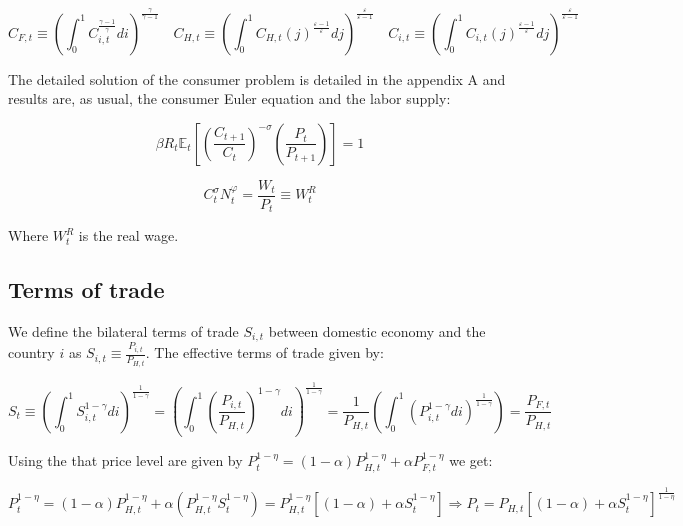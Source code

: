 \documentclass{article}
\newcommand{\Et}{\mathbb{E}_t}
\begin{document}
\begin{equation*}
    C_{F,t} \equiv \left( \int^1_0 C_{i,t}^{\frac{\gamma-1}{\gamma}} di \right)^{\frac{\gamma}{\gamma-1}} \quad C_{H,t} \equiv \left( \int^1_0 C_{H,t}(j)^{\frac{\varepsilon-1}{\varepsilon}} dj \right)^{\frac{\varepsilon}{\varepsilon-1}} \quad C_{i,t} \equiv \left( \int^1_0 C_{i,t}(j)^{\frac{\varepsilon-1}{\varepsilon}} dj \right)^{\frac{\varepsilon}{\varepsilon-1}}
\end{equation*}



The detailed solution of the consumer problem is detailed in the appendix A and results are, as usual, the consumer Euler equation and the labor supply:

\begin{equation}
    \label{euler}
    \beta R_t \Et\left[\left(\frac{C_{t+1}}{C_t} \right)^{-\sigma} \left(\frac{P_t}{P_{t+1}} \right) \right] = 1
\end{equation}

\begin{equation}
    \label{labour_supply}
    C_t^\sigma N_t^\varphi = \frac{W_t}{P_t} \equiv W_t^R
\end{equation}

Where $W_t^R$ is the real wage.

\subsection{Terms of trade}
We define the bilateral terms of trade $S_{i,t}$ between domestic economy and the country $i$ as $S_{i,t} \equiv \frac{P_{i,t}}{P_{H,t}}$. The effective terms of trade given by:

\begin{equation}
    S_t \equiv \left(\int^1_0 S_{i,t}^{1-\gamma} di \right)^{\frac{1}{1-\gamma}} = \left(\int^1_0 \left(\frac{P_{i,t}}{P_{H,t}}  \right)^{1-\gamma}  di \right)^{\frac{1}{1-\gamma}} = \frac{1}{P_{H,t}} \left(\int^1_0 \left(P_{i,t}^{1-\gamma} di \right)^{\frac{1}{1-\gamma}}\right) = \frac{P_{F,t}}{P_{H,t}}
\end{equation}

Using the that price level are given by $P_t^{1-\eta} = (1-\alpha) P_{H,t}^{1-\eta} + \alpha P_{F,t}^{1-\eta}$ we get:

\begin{equation}
    \label{tot_level}
    P_t^{1-\eta} = (1-\alpha) P_{H,t}^{1-\eta} + \alpha \left( P_{H,t}^{1-\eta} S_{t}^{1-\eta} \right) = P_{H,t}^{1-\eta} \left[(1-\alpha) + \alpha S_t^{1-\eta} \right] \Rightarrow P_t = P_{H,t} \left[(1-\alpha) + \alpha S_t^{1-\eta} \right]^{\frac{1}{1-\eta}} 
\end{equation}
\end{document}
